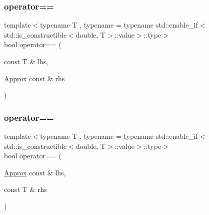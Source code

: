 \subsubsection{\texorpdfstring{operator==}{operator==}\hspace{0.1cm}{\footnotesize\ttfamily [1/2]}}
{\footnotesize\ttfamily template$<$typename T , typename  = typename std\+::enable\+\_\+if$<$std\+::is\+\_\+constructible$<$double, T$>$\+::value$>$\+::type$>$ \\
bool operator== (\begin{DoxyParamCaption}\item[{const T \&}]{lhs,  }\item[{\mbox{\hyperlink{class_catch_1_1_detail_1_1_approx}{Approx}} const \&}]{rhs }\end{DoxyParamCaption})\hspace{0.3cm}{\ttfamily [friend]}}

\mbox{\label{class_catch_1_1_detail_1_1_approx_a0e5ef1957d4c38d7857005909c613743}} 
\subsubsection{\texorpdfstring{operator==}{operator==}\hspace{0.1cm}{\footnotesize\ttfamily [2/2]}}
{\footnotesize\ttfamily template$<$typename T , typename  = typename std\+::enable\+\_\+if$<$std\+::is\+\_\+constructible$<$double, T$>$\+::value$>$\+::type$>$ \\
bool operator== (\begin{DoxyParamCaption}\item[{\mbox{\hyperlink{class_catch_1_1_detail_1_1_approx}{Approx}} const \&}]{lhs,  }\item[{const T \&}]{rhs }\end{DoxyParamCaption})\hspace{0.3cm}{\ttfamily [friend]}}

\mbox{\label{class_catch_1_1_detail_1_1_approx_affd27efc62be386daeecb7a09e828d44}} 
